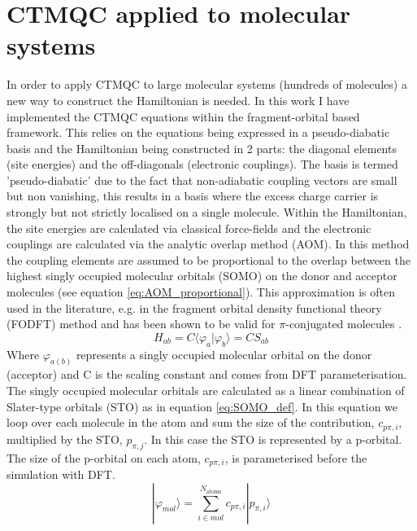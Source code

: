 \chapter{CTMQC applied to molecular systems}
\label{chap:molecular_systems}
In order to apply CTMQC to large molecular systems (hundreds of molecules) a new way to construct the Hamiltonian is needed. In this work I have implemented the CTMQC equations within the fragment-orbital based framework. This relies on the equations being expressed in a pseudo-diabatic basis and the Hamiltonian being constructed in 2 parts: the diagonal elements (site energies) and the off-diagonals (electronic couplings). The basis is termed 'pseudo-diabatic' due to the fact that non-adiabatic coupling vectors are small but non vanishing, this results in a basis where the excess charge carrier is strongly but not strictly localised on a single molecule. Within the Hamiltonian, the site energies are calculated via classical force-fields and the electronic couplings are calculated via the analytic overlap method \cite{gajdos_ultrafast_2014, spencer_fob-sh:_2016} (AOM). In this method the coupling elements are assumed to be proportional to the overlap between the highest singly occupied molecular orbitals (SOMO) on the donor and acceptor molecules (see equation \eqref{eq:AOM_proportional}). This approximation is often used in the literature, e.g. in the fragment orbital density functional theory \cite{KirkpatrickJ2008,C2CP41348E,TroisiA2002} (FODFT) method and has been shown to be valid for $\pi$-conjugated molecules \cite{KubasA2014, gajdos_ultrafast_2014}.
\begin{equation}
  H_{ab} = C \langle \varphi_{a} | \varphi_{b} \rangle = C S_{ab}
  \label{eq:AOM_proportional}
\end{equation}
Where $\varphi_{a(b)}$ represents a singly occupied molecular orbital on the donor (acceptor) and C is the scaling constant and comes from DFT parameterisation. The singly occupied molecular orbitals are calculated as a linear combination of Slater-type orbitals (STO) as in equation  \eqref{eq:SOMO_def}. In this equation we loop over each molecule in the atom and sum the size of the contribution, $c_{p\pi, i}$, multiplied by the STO, $p_{\pi, j}$. In this case the STO is represented by a p-orbital. The size of the p-orbital on each atom, $c_{p\pi, i}$, is parameterised before the simulation with DFT.
\begin{equation}
  | \varphi_{mol} \rangle = \sum_{i \in mol}^{N_{\text{atoms}}} c_{p\pi, i} | p_{\pi, i} \rangle
  \label{eq:SOMO_def}
\end{equation}


